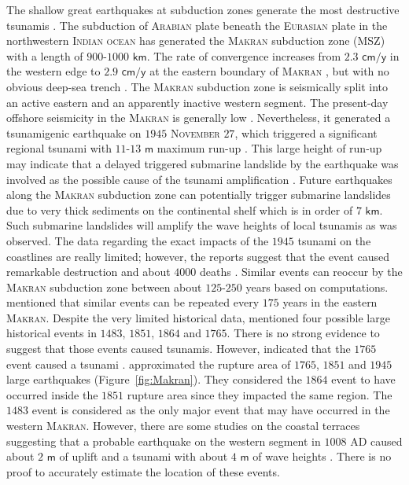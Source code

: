 \documentclass[12pt]{llncs}
\begin{document}
The shallow great earthquakes at subduction zones generate the most destructive tsunamis \citep{Satake1999}. The subduction of \textsc{Arabian} plate beneath the \textsc{Eurasian} plate in the northwestern \textsc{Indian ocean} has generated the \textsc{Makran} subduction zone (MSZ) with a length of $900$-$1000$ $\mathsf{km}$. The rate of convergence increases from $2.3$ $\mathsf{cm/y}$ in the western edge to $2.9$ $\mathsf{cm/y}$ at the eastern boundary of \textsc{Makran} \citep{GJI:GJI2558}, but with no obvious deep-sea trench \citep{SCHLUTER2002219}. The \textsc{Makran} subduction zone is seismically split into an active eastern and an apparently inactive western segment. The present-day offshore seismicity in the \textsc{Makran} is generally low \citep{JGRB:JGRB17250}. Nevertheless, it generated a tsunamigenic earthquake on $1945$ \textsc{November} $27$, which triggered a significant regional tsunami with $11$-$13$ $\mathsf{m}$ maximum run-up \citep{ambraseys1982history, Okal2008, SHAHHOSSEINI201117}. This large height of run-up may indicate that a delayed triggered submarine landslide by the earthquake was involved as the possible cause of the tsunami amplification \citep{ambraseys1982history, doi:10.1785/0120160196}. Future earthquakes along the \textsc{Makran} subduction zone can potentially trigger submarine landslides due to very thick sediments on the continental shelf which is in order of $7$ $\mathsf{km}$. Such submarine landslides will amplify the wave heights of local tsunamis as was observed. The data regarding the exact impacts of the $1945$ tsunami on the coastlines are really limited; however, the reports suggest that the event caused remarkable destruction and about $4000$ deaths \citep{Heck1947, ambraseys1982history, HEIDARZADEH2008774}. Similar events can reoccur by the \textsc{Makran} subduction zone between about $125$-$250$ years based on \cite{PAGE1979533} computations. \cite{JGRB:JGRB8463} mentioned that similar events can be repeated every $175$ years in the eastern \textsc{Makran}. Despite the very limited historical data, \cite{Quittmeyer1979} mentioned four possible large historical events in $1483$, $1851$, $1864$ and $1765$. There is no strong evidence to suggest that those events caused tsunamis. However, \cite{ambraseys1982history} indicated that the $1765$ event caused a tsunami \citep{ZarifiTh}. \cite{JGRB:JGRB8463} approximated the rupture area of $1765$, $1851$ and $1945$ large earthquakes (Figure~\ref{fig:Makran}). They considered the $1864$ event to have occurred inside the $1851$ rupture area since they impacted the same region. The $1483$ event is considered as the only major event that may have occurred in the western \textsc{Makran}. However, there are some studies on the coastal terraces suggesting that a probable earthquake on the western segment in $1008$ AD caused about $2$ $\mathsf{m}$ of uplift and a tsunami with about $4$ $\mathsf{m}$ of wave heights \citep{ambraseys1982history, SHAHHOSSEINI201117, doi:10.1093/gji/ggw001}. There is no proof to accurately estimate the location of these events.
\end{document}
